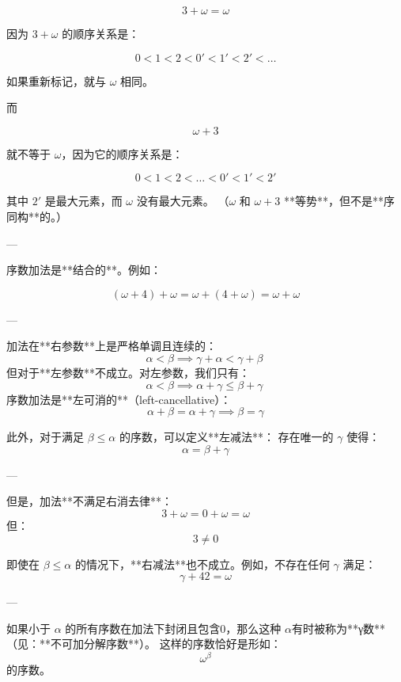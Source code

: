\[
3 + \omega = \omega
\]

因为 \(3 + \omega\) 的顺序关系是：

\[
0 < 1 < 2 < 0' < 1' < 2' < \dots
\]

如果重新标记，就与 \(\omega\) 相同。  

而

\[
\omega + 3
\]

就不等于 \(\omega\)，因为它的顺序关系是：

\[
0 < 1 < 2 < \dots < 0' < 1' < 2'
\]

其中 \(2'\) 是最大元素，而 \(\omega\) 没有最大元素。  
（\(\omega\) 和 \(\omega + 3\) **等势**，但不是**序同构**的。）

---

序数加法是**结合的**。例如：

\[
(\omega + 4) + \omega = \omega + (4 + \omega) = \omega + \omega
\]

---

加法在**右参数**上是严格单调且连续的：
\[
\alpha < \beta \implies \gamma + \alpha < \gamma + \beta~
\]
但对于**左参数**不成立。对左参数，我们只有：
\[
\alpha < \beta \implies \alpha + \gamma \leq \beta + \gamma~
\]
序数加法是**左可消的**（left-cancellative）：  
\[
\alpha + \beta = \alpha + \gamma \implies \beta = \gamma
\]

此外，对于满足 \(\beta \leq \alpha\) 的序数，可以定义**左减法**：  
存在唯一的 \(\gamma\) 使得：
\[
\alpha = \beta + \gamma
\]

---

但是，加法**不满足右消去律**：  
\[
3 + \omega = 0 + \omega = \omega
\]
但：
\[
3 \neq 0
\]

即使在 \(\beta \leq \alpha\) 的情况下，**右减法**也不成立。例如，不存在任何 \(\gamma\) 满足：
\[
\gamma + 42 = \omega
\]

---

如果小于 \(\alpha\) 的所有序数在加法下封闭且包含0，那么这种 \(\alpha\)有时被称为**γ数**（见：**不可加分解序数**）。  
这样的序数恰好是形如：
\[
\omega^\beta
\]
的序数。